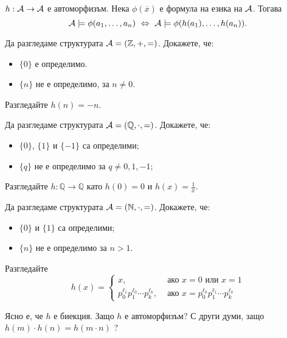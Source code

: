 \begin{theorem}
  $h:\mathcal{A}\to\mathcal{A}$ е автоморфизъм. Нека $\phi(\overline{x})$ е формула на езика на $\mathcal{A}$. Тогава
  \[\mathcal{A} \models \phi(a_1,\dots,a_n) \ \Leftrightarrow\  \mathcal{A} \models \phi(h(a_1),\dots,h(a_n)).\]
\end{theorem}

\begin{problem}
  Да разгледаме структурата $\mathcal{A} = (\mathbb{Z},+,=)$.
  Докажете, че:
  \begin{itemize}
  \item 
    $\{0\}$ е определимо.
  \item
    $\{n\}$ не е определимо, за $n \neq 0$.
  \end{itemize}
\end{problem}
\begin{hint}
  Разгледайте $h(n) = -n$.
\end{hint}

\begin{problem}
  Да разгледаме структурата $\mathcal{A} = (\mathbb{Q}, \cdot, =)$.
  Докажете, че:
  \begin{itemize}
  \item
    $\{0\}$, $\{1\}$ и $\{-1\}$ са определими;
  \item
    $\{q\}$ не е определимо за $q \neq 0,1,-1$;
  \end{itemize}
\end{problem}
\begin{hint}
  Разгледайте $h:\mathbb{Q} \to \mathbb{Q}$ като
  $h(0) = 0$ и $h(x) = \frac{1}{x}$.  
\end{hint}

\begin{problem}
  Да разгледаме структурата $\mathcal{A} = (\mathbb{N}, \cdot ,=)$.
  Докажете, че:
  \begin{itemize}
  \item
    $\{0\}$ и $\{1\}$ са определими;
  \item
    $\{n\}$ не е определимо за $n > 1$.
  \end{itemize}
\end{problem}
\begin{hint}
  Разгледайте
  \[h(x) =
    \begin{cases}
      x, & \text{ ако }x = 0 \text{ или } x = 1\\
      p^{\ell_1}_0p^{\ell_0}_1\cdots p^{\ell_k}_k, & \text{ ако }x = p^{\ell_0}_0 p^{\ell_1}_1 \cdots p^{\ell_k}_k
    \end{cases}\]

  Ясно е, че $h$ е биекция. Защо $h$ е автоморфизъм?
  С други думи, защо $h(m) \cdot h(n) = h(m \cdot n)$ ?
\end{hint}

